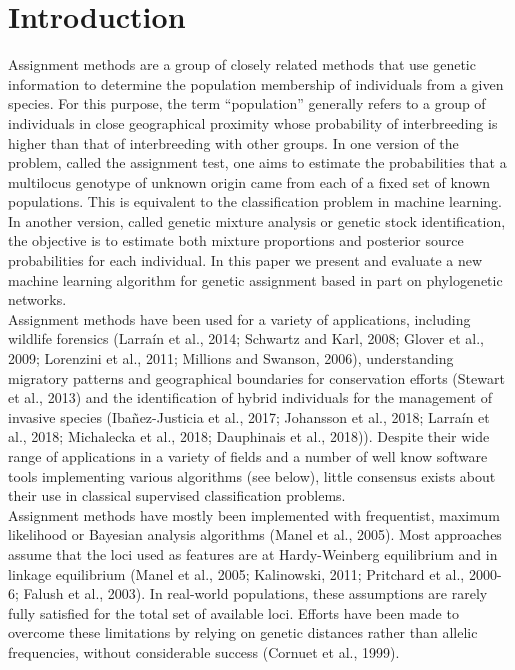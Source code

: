 \documentclass{bioinfo}
\begin{document}
\maketitle

\section{Introduction}

Assignment methods are a group of closely related methods that use genetic information to determine the population membership of individuals from a given species. For this purpose, the term “population” generally refers to a group of individuals in close geographical proximity whose probability of interbreeding is higher than that of interbreeding with other groups. In one version of the problem, called the assignment test, one aims to estimate the probabilities that a multilocus genotype of unknown origin came from each of a fixed set of known populations. This is equivalent to the classification problem in machine learning. In another version, called genetic mixture analysis or genetic stock identification, the objective is to estimate both mixture proportions and posterior source probabilities for each individual. In this paper we present and evaluate a new machine learning algorithm for genetic assignment based in part on phylogenetic networks.\\
Assignment methods have been used for a variety of applications, including wildlife forensics (Larraín et al., 2014; Schwartz and Karl, 2008; Glover et al., 2009; Lorenzini et al., 2011; Millions and Swanson, 2006), understanding migratory patterns and geographical boundaries for conservation efforts (Stewart et al., 2013) and the identification of hybrid individuals for the management of invasive species (Ibañez-Justicia et al., 2017; Johansson et al., 2018; Larraín et al., 2018; Michalecka et al., 2018; Dauphinais et al., 2018)). Despite their wide range of applications in a variety of fields and a number of well know software tools implementing various algorithms (see below), little consensus exists about their use in classical supervised classification problems. \\
Assignment methods have mostly been implemented with frequentist, maximum likelihood or Bayesian analysis algorithms (Manel et al., 2005). Most  approaches assume that the loci used as features are at Hardy-Weinberg equilibrium and in linkage equilibrium (Manel et al., 2005; Kalinowski, 2011; Pritchard et al., 2000-6; Falush et al., 2003). In real-world populations, these assumptions are rarely fully satisfied for the total set of available loci. Efforts have been made to overcome these limitations by relying on genetic distances rather than allelic frequencies, without considerable success (Cornuet et al., 1999).\\
\end{document}
